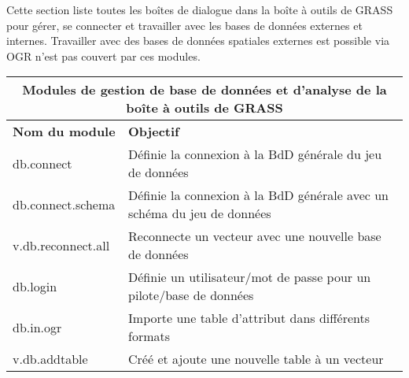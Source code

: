 Cette section liste toutes les boîtes de dialogue dans la boîte à outils de GRASS pour gérer, se connecter et travailler avec les bases de données externes et internes. Travailler avec des bases de données spatiales externes est possible via OGR n'est pas couvert par ces modules.

\begin{table}[H]
\centering
 \begin{tabular}{|p{4cm}|p{10cm}|}
\hline \multicolumn{2}{|c|}{\textbf{Modules de gestion de base de données et d'analyse de la boîte à outils de GRASS}} \\
  \hline \textbf{Nom du module} & \textbf{Objectif} \\
  \hline db.connect & Définie la connexion à la BdD générale du jeu de données \\
  \hline db.connect.schema & Définie la connexion à la BdD générale avec un schéma du jeu de données\\
  \hline v.db.reconnect.all & Reconnecte un vecteur avec une nouvelle base de données\\
  \hline db.login & Définie un utilisateur/mot de passe pour un pilote/base de données\\
  \hline db.in.ogr & Importe une table d'attribut dans différents formats\\
  \hline v.db.addtable & Créé et ajoute une nouvelle table à un vecteur\\

\end{tabular}
\end{table}
